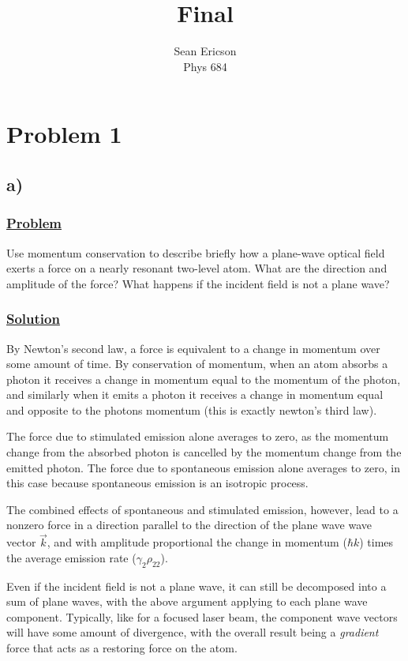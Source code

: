 \documentclass[12pt]{article}
\begin{document}
	
\title{Final}
\author{Sean Ericson \\ Phys 684}
\maketitle

\section*{Problem 1}
\subsection*{a)}
\subsubsection*{\underline{Problem}}
Use momentum conservation to describe briefly how a plane-wave optical field exerts a force on a nearly resonant two-level atom.
What are the direction and amplitude of the force?
What happens if the incident field is not a plane wave?

\subsubsection*{\underline{Solution}}
By Newton's second law, a force is equivalent to a change in momentum over some amount of time. 
By conservation of momentum, when an atom absorbs a photon it receives a change in momentum equal to the momentum of the photon, and similarly when it emits a photon it receives a change in momentum equal and opposite to the photons momentum (this is exactly newton's third law).

The force due to stimulated emission alone averages to zero, as the momentum change from the absorbed photon is cancelled by the momentum change from the emitted photon.
The force due to spontaneous emission alone averages to zero, in this case because spontaneous emission is an isotropic process.

The combined effects of spontaneous and stimulated emission, however, lead to a nonzero force in a direction parallel to the direction of the plane wave wave vector $\vec{k}$, and with amplitude proportional the change in momentum ($\hbar k$) times the average emission rate ($\gamma_2\rho_{22}$).

Even if the incident field is not a plane wave, it can still be decomposed into a sum of plane waves, with the above argument applying to each plane wave component.
Typically, like for a focused laser beam, the component wave vectors will have some amount of divergence, with the overall result being a \textit{gradient} force that acts as a restoring force on the atom.
\end{document}
